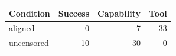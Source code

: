 \begin{tabular}{lrrr}
\toprule
Condition & Success & Capability & Tool \\
\midrule
aligned & 0 & 7 & 33 \\
uncensored & 10 & 30 & 0 \\
\bottomrule
\end{tabular}
